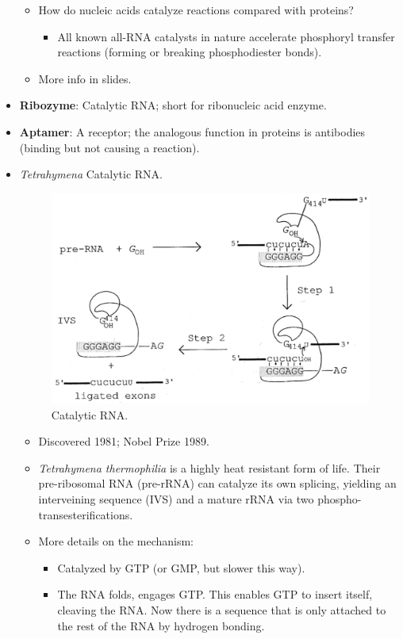 \documentclass[../notes.tex]{subfiles}
\begin{document}
\begin{itemize}
\begin{itemize}
\begin{itemize}
        \end{itemize}
        \item How do nucleic acids catalyze reactions compared with proteins?
        \begin{itemize}
            \item All known all-RNA catalysts in nature accelerate phosphoryl transfer reactions (forming or breaking phosphodiester bonds).
        \end{itemize}
        \item More info in slides.
    \end{itemize}
    \item \textbf{Ribozyme}: Catalytic RNA; short for ribonucleic acid enzyme.
    \item \textbf{Aptamer}: A receptor; the analogous function in proteins is antibodies (binding but not causing a reaction).
    \item \emph{Tetrahymena} Catalytic RNA.
    \begin{figure}[h!]
        \centering
        \includegraphics[width=0.6\linewidth]{../ExtFiles/catalyticRNA.png}
        \caption{Catalytic RNA.}
        \label{fig:catalyticRNA}
    \end{figure}
    \begin{itemize}
        \item Discovered 1981; Nobel Prize 1989.
        \item \emph{Tetrahymena thermophilia} is a highly heat resistant form of life. Their pre-ribosomal RNA (pre-rRNA) can catalyze its own splicing, yielding an interveining sequence (IVS) and a mature rRNA via two phospho-transesterifications.
        \item More details on the mechanism:
        \begin{itemize}
            \item Catalyzed by GTP (or GMP, but slower this way).
            \item The RNA folds, engages GTP. This enables GTP to insert itself, cleaving the RNA. Now there is a sequence that is only attached to the rest of the RNA by hydrogen bonding.

\end{itemize}
\end{itemize}
\end{itemize}
\end{document}
